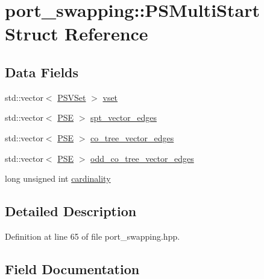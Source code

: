 \hypertarget{structport__swapping_1_1PSMultiStart}{}\section{port\+\_\+swapping\+:\+:P\+S\+Multi\+Start Struct Reference}
\label{structport__swapping_1_1PSMultiStart}
\subsection*{Data Fields}
\begin{DoxyCompactItemize}
\item 
std\+::vector$<$ \hyperlink{structport__swapping_1_1PSVSet}{P\+S\+V\+Set} $>$ \hyperlink{structport__swapping_1_1PSMultiStart_a13e1f84d967b48cae042840f7e33eee3}{vset}
\item 
std\+::vector$<$ \hyperlink{classport__swapping_ac98b23b7c2dd3f3792327fb666489d66}{P\+SE} $>$ \hyperlink{structport__swapping_1_1PSMultiStart_ad1f8e79102da09a136580faceba55279}{spt\+\_\+vector\+\_\+edges}
\item 
std\+::vector$<$ \hyperlink{classport__swapping_ac98b23b7c2dd3f3792327fb666489d66}{P\+SE} $>$ \hyperlink{structport__swapping_1_1PSMultiStart_a98b2092189fba94528fc0c2b261bb08b}{co\+\_\+tree\+\_\+vector\+\_\+edges}
\item 
std\+::vector$<$ \hyperlink{classport__swapping_ac98b23b7c2dd3f3792327fb666489d66}{P\+SE} $>$ \hyperlink{structport__swapping_1_1PSMultiStart_ae4c62c26b89edc00edc4a50e8492c8ea}{odd\+\_\+co\+\_\+tree\+\_\+vector\+\_\+edges}
\item 
long unsigned int \hyperlink{structport__swapping_1_1PSMultiStart_a7e9a428ce3ee9bd9cb36a6702dc50033}{cardinality}
\end{DoxyCompactItemize}


\subsection{Detailed Description}


Definition at line 65 of file port\+\_\+swapping.\+hpp.



\subsection{Field Documentation}
\mbox{\label{structport__swapping_1_1PSMultiStart_a7e9a428ce3ee9bd9cb36a6702dc50033}} 
